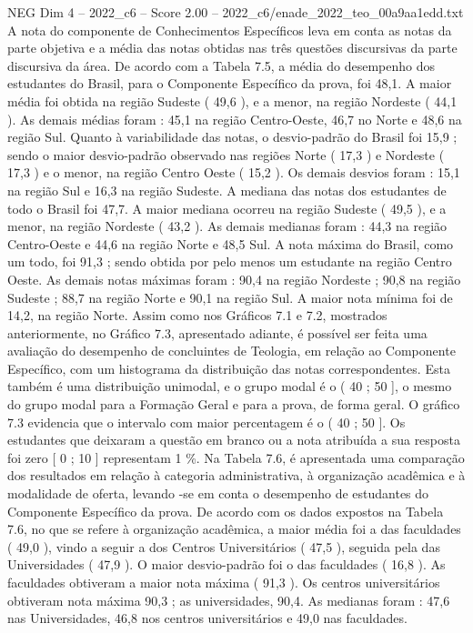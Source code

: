 \begin{textsample}{NEG Dim 4 – 2022\_c6 – Score 2.00 – 2022\_c6/enade\_2022\_teo\_00a9aa1edd.txt}
A nota do componente de Conhecimentos Específicos leva em conta as notas da parte objetiva e a média das notas obtidas nas três questões discursivas da parte discursiva da área.
De acordo com a Tabela 7.5, a média do desempenho dos estudantes do Brasil, para o Componente Específico da prova, foi 48,1.
A maior média foi obtida na região Sudeste ( 49,6 ), e a menor, na região Nordeste ( 44,1 ).
As demais médias foram : 45,1 na região Centro-Oeste, 46,7 no Norte e 48,6 na região Sul.
Quanto à variabilidade das notas, o desvio-padrão do Brasil foi 15,9 ; sendo o maior desvio-padrão observado nas regiões Norte ( 17,3 ) e Nordeste ( 17,3 ) e o menor, na região Centro Oeste ( 15,2 ).
Os demais desvios foram : 15,1 na região Sul e 16,3 na região Sudeste.
A mediana das notas dos estudantes de todo o Brasil foi 47,7.
A maior mediana ocorreu na região Sudeste ( 49,5 ), e a menor, na região Nordeste ( 43,2 ).
As demais medianas foram : 44,3 na região Centro-Oeste e 44,6 na região Norte e 48,5 Sul.
A nota máxima do Brasil, como um todo, foi 91,3 ; sendo obtida por pelo menos um estudante na região Centro Oeste.
As demais notas máximas foram : 90,4 na região Nordeste ; 90,8 na região Sudeste ; 88,7 na região Norte e 90,1 na região Sul.
A maior nota mínima foi de 14,2, na região Norte.
Assim como nos Gráficos 7.1 e 7.2, mostrados anteriormente, no Gráfico 7.3, apresentado adiante, é possível ser feita uma avaliação do desempenho de concluintes de Teologia, em relação ao Componente Específico, com um histograma da distribuição das notas correspondentes.
Esta também é uma distribuição unimodal, e o grupo modal é o ( 40 ; 50 ], o mesmo do grupo modal para a Formação Geral e para a prova, de forma geral.
O gráfico 7.3 evidencia que o intervalo com maior percentagem é o ( 40 ; 50 ].
Os estudantes que deixaram a questão em branco ou a nota atribuída a sua resposta foi zero [ 0 ; 10 ] representam 1 \%.
Na Tabela 7.6, é apresentada uma comparação dos resultados em relação à categoria administrativa, à organização acadêmica e à modalidade de oferta, levando -se em conta o desempenho de estudantes do Componente Específico da prova.
De acordo com os dados expostos na Tabela 7.6, no que se refere à organização acadêmica, a maior média foi a das faculdades ( 49,0 ), vindo a seguir a dos Centros Universitários ( 47,5 ), seguida pela das Universidades ( 47,9 ).
O maior desvio-padrão foi o das faculdades ( 16,8 ).
As faculdades obtiveram a maior nota máxima ( 91,3 ).
Os centros universitários obtiveram nota máxima 90,3 ; as universidades, 90,4.
As medianas foram : 47,6 nas Universidades, 46,8 nos centros universitários e 49,0 nas faculdades.

\end{textsample}
